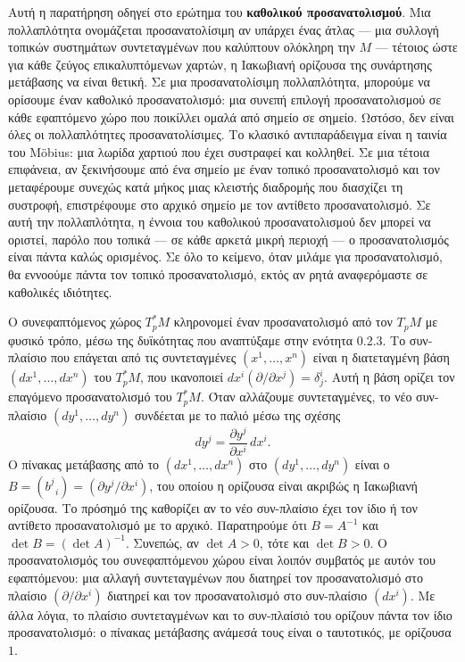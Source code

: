 \documentclass[11pt,a4paper,twoside,openright]{book}
\begin{document}
Αυτή η παρατήρηση οδηγεί στο ερώτημα του \textbf{καθολικού προσανατολισμού}. Μια πολλαπλότητα ονομάζεται προσανατολίσιμη αν υπάρχει ένας άτλας --- μια συλλογή τοπικών συστημάτων συντεταγμένων που καλύπτουν ολόκληρη την $M$ --- τέτοιος ώστε για κάθε ζεύγος επικαλυπτόμενων χαρτών, η Ιακωβιανή ορίζουσα της συνάρτησης μετάβασης να είναι θετική. Σε μια προσανατολίσιμη πολλαπλότητα, μπορούμε να ορίσουμε έναν καθολικό προσανατολισμό: μια συνεπή επιλογή προσανατολισμού σε κάθε εφαπτόμενο χώρο που ποικίλλει ομαλά από σημείο σε σημείο. Ωστόσο, δεν είναι όλες οι πολλαπλότητες προσανατολίσιμες. Το κλασικό αντιπαράδειγμα είναι η ταινία του Möbius: μια λωρίδα χαρτιού που έχει συστραφεί και κολληθεί. Σε μια τέτοια επιφάνεια, αν ξεκινήσουμε από ένα σημείο με έναν τοπικό προσανατολισμό και τον μεταφέρουμε συνεχώς κατά μήκος μιας κλειστής διαδρομής που διασχίζει τη συστροφή, επιστρέφουμε στο αρχικό σημείο με τον αντίθετο προσανατολισμό. Σε αυτή την πολλαπλότητα, η έννοια του καθολικού προσανατολισμού δεν μπορεί να οριστεί, παρόλο που τοπικά --- σε κάθε αρκετά μικρή περιοχή --- ο προσανατολισμός είναι πάντα καλώς ορισμένος. Σε όλο το κείμενο, όταν μιλάμε για προσανατολισμό, θα εννοούμε πάντα τον τοπικό προσανατολισμό, εκτός αν ρητά αναφερόμαστε σε καθολικές ιδιότητες.

Ο συνεφαπτόμενος χώρος $T_p^*M$ κληρονομεί έναν προσανατολισμό από τον $T_pM$ με φυσικό τρόπο, μέσω της δυϊκότητας που αναπτύξαμε στην ενότητα 0.2.3. Το συν-πλαίσιο που επάγεται από τις συντεταγμένες $(x^1, \dots, x^n)$ είναι η διατεταγμένη βάση $(dx^1, \dots, dx^n)$ του $T_p^*M$, που ικανοποιεί $dx^i(\partial / \partial x^j) = \delta^i_j$. Αυτή η βάση ορίζει τον επαγόμενο προσανατολισμό του $T_p^*M$. Όταν αλλάζουμε συντεταγμένες, το νέο συν-πλαίσιο $(dy^1, \dots, dy^n)$ συνδέεται με το παλιό μέσω της σχέσης
\[
dy^j = \frac{\partial y^j}{\partial x^i} \, dx^i.
\]
Ο πίνακας μετάβασης από το $(dx^1, \dots, dx^n)$ στο $(dy^1, \dots, dy^n)$ είναι ο $B = (b^j_{\;\; i}) = (\partial y^j / \partial x^i)$, του οποίου η ορίζουσα είναι ακριβώς η Ιακωβιανή ορίζουσα. Το πρόσημό της καθορίζει αν το νέο συν-πλαίσιο έχει τον ίδιο ή τον αντίθετο προσανατολισμό με το αρχικό. Παρατηρούμε ότι $B = A^{-1}$ και $\det B = (\det A)^{-1}$. Συνεπώς, αν $\det A > 0$, τότε και $\det B > 0$. Ο προσανατολισμός του συνεφαπτόμενου χώρου είναι λοιπόν συμβατός με αυτόν του εφαπτόμενου: μια αλλαγή συντεταγμένων που διατηρεί τον προσανατολισμό στο πλαίσιο $(\partial / \partial x^i)$ διατηρεί και τον προσανατολισμό στο συν-πλαίσιο $(dx^i)$. Με άλλα λόγια, το πλαίσιο συντεταγμένων και το συν-πλαίσιό του ορίζουν πάντα τον ίδιο προσανατολισμό: ο πίνακας μετάβασης ανάμεσά τους είναι ο ταυτοτικός, με ορίζουσα $1$.
\end{document}
